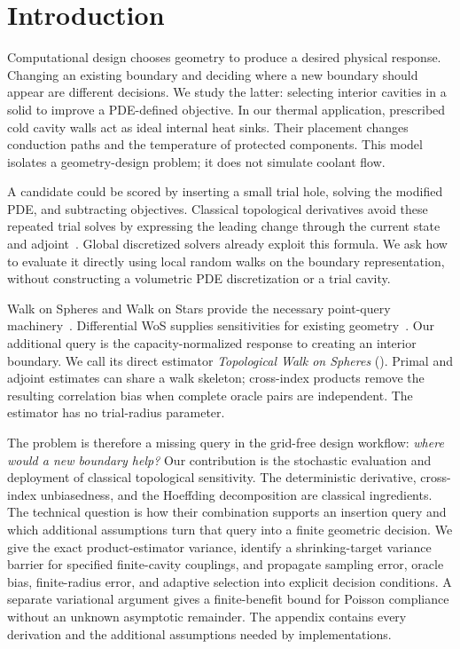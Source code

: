 \section{Introduction}
\label{sec:introduction}

Computational design chooses geometry to produce a desired physical response.
Changing an existing boundary and deciding where a new boundary should appear
are different decisions. We study the latter: selecting interior cavities in
a solid to improve a PDE-defined objective. In our thermal application,
prescribed cold cavity walls act as ideal internal heat sinks. Their placement
changes conduction paths and the temperature of protected components. This
model isolates a geometry-design problem; it does not simulate coolant flow.

A candidate could be scored by inserting a small trial hole, solving the
modified PDE, and subtracting objectives. Classical topological derivatives
avoid these repeated trial solves by expressing the leading change through
the current state and adjoint~\cite{cea2000topological,novotny2012topological}.
Global discretized solvers already exploit this formula. We ask how to evaluate
it directly using local random walks on the boundary representation, without
constructing a volumetric PDE discretization or a trial cavity.

Walk on Spheres and Walk on Stars provide the necessary point-query
machinery~\cite{muller1956some,sawhney2023walk}. Differential WoS supplies
sensitivities for existing geometry~\cite{miller2024differential}.
Our additional query is the capacity-normalized response to creating an
interior boundary. We call its direct estimator \emph{Topological Walk on
Spheres} (\method{}). Primal and adjoint estimates can share a walk skeleton;
cross-index products remove the resulting correlation bias when complete
oracle pairs are independent. The estimator has no trial-radius parameter.

The problem is therefore a missing query in the grid-free design workflow:
\emph{where would a new boundary help?} Our contribution is the stochastic
evaluation and deployment of classical topological sensitivity. The deterministic derivative, cross-index unbiasedness, and the
Hoeffding decomposition are classical ingredients. The technical question
is how their
combination supports an insertion query and which additional assumptions
turn that query into a finite geometric decision. We give the exact product-estimator variance,
identify a shrinking-target variance barrier for specified finite-cavity
couplings, and propagate sampling error, oracle bias, finite-radius error,
and adaptive selection into explicit decision conditions. A separate
variational argument gives a finite-benefit bound for Poisson compliance
without an unknown asymptotic remainder. The appendix contains every
derivation and the additional assumptions needed by implementations.

